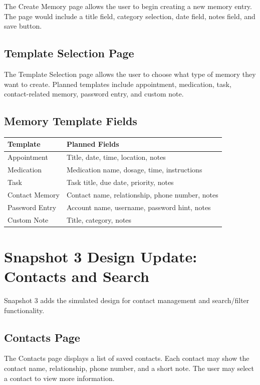 \documentclass{article}
\begin{document}
The Create Memory page allows the user to begin creating a new memory entry. The page would include a title field, category selection, date field, notes field, and save button.

\subsection{Template Selection Page}

The Template Selection page allows the user to choose what type of memory they want to create. Planned templates include appointment, medication, task, contact-related memory, password entry, and custom note.

\subsection{Memory Template Fields}

\begin{longtable}{|p{4cm}|p{9cm}|}
\hline
Template & Planned Fields \\ \hline
Appointment & Title, date, time, location, notes \\ \hline
Medication & Medication name, dosage, time, instructions \\ \hline
Task & Task title, due date, priority, notes \\ \hline
Contact Memory & Contact name, relationship, phone number, notes \\ \hline
Password Entry & Account name, username, password hint, notes \\ \hline
Custom Note & Title, category, notes \\ \hline
\end{longtable}

\section{Snapshot 3 Design Update: Contacts and Search}

Snapshot 3 adds the simulated design for contact management and search/filter functionality.

\subsection{Contacts Page}

The Contacts page displays a list of saved contacts. Each contact may show the contact name, relationship, phone number, and a short note. The user may select a contact to view more information.
\end{document}

